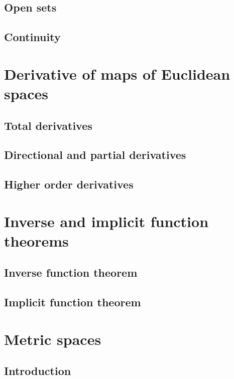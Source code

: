 \documentclass[../Year2.tex]{subfiles}
\begin{document}
\subsection{Open sets}

\subsection{Continuity}

\section{Derivative of maps of Euclidean spaces}

\subsection{Total derivatives}

\subsection{Directional and partial derivatives}

\subsection{Higher order derivatives}

\section{Inverse and implicit function theorems}

\subsection{Inverse function theorem}

\subsection{Implicit function theorem}

\section{Metric spaces}

\subsection{Introduction}
\end{document}
